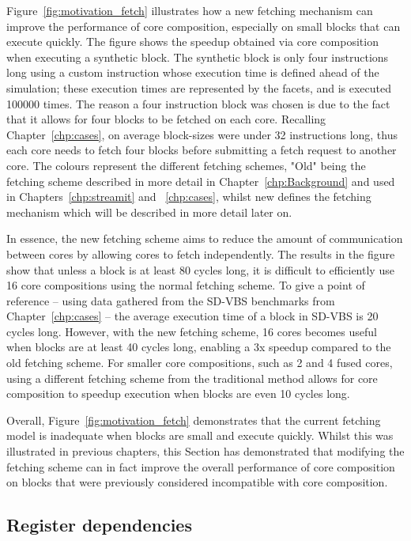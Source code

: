 Figure~\ref{fig:motivation_fetch} illustrates how a new fetching mechanism can improve the performance of core composition, especially on small blocks that can execute quickly.
The figure shows the speedup obtained via core composition when executing a synthetic block.
The synthetic block is only four instructions long using a custom instruction whose execution time is defined ahead of the simulation; these execution times are represented by the facets, and is executed 100000 times.
The reason a four instruction block was chosen is due to the fact that it allows for four blocks to be fetched on each core.
Recalling Chapter~\ref{chp:cases}, on average block-sizes were under 32 instructions long, thus each core needs to fetch four blocks before submitting a fetch request to another core.
The colours represent the different fetching schemes, "Old" being the fetching scheme described in more detail in Chapter~\ref{chp:Background} and used in Chapters~\ref{chp:streamit} and ~\ref{chp:cases}, whilst new defines the fetching mechanism which will be described in more detail later on.

In essence, the new fetching scheme aims to reduce the amount of communication between cores by allowing cores to fetch independently.
The results in the figure show that unless a block is at least 80 cycles long, it is difficult to efficiently use 16 core compositions using the normal fetching scheme.
To give a point of reference -- using data gathered from the SD-VBS benchmarks from Chapter~\ref{chp:cases} -- the average execution time of a block in SD-VBS is 20 cycles long.
However, with the new fetching scheme, 16 cores becomes useful when blocks are at least 40 cycles long, enabling a 3x speedup compared to the old fetching scheme.
For smaller core compositions, such as 2 and 4 fused cores, using a different fetching scheme from the traditional method allows for core composition to speedup execution when blocks are even 10 cycles long.

Overall, Figure~\ref{fig:motivation_fetch} demonstrates that the current fetching model is inadequate when blocks are small and execute quickly.
Whilst this was illustrated in previous chapters, this Section has demonstrated that modifying the fetching scheme can in fact improve the overall performance of core composition on blocks that were previously considered incompatible with core composition.

\subsection{Register dependencies}

